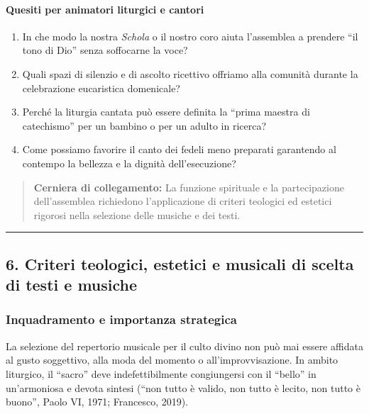\documentclass[12pt,a4paper]{article}
\begin{document}
	\paragraph{Quesiti per animatori liturgici e cantori}\label{quesiti-per-animatori-liturgici-e-cantori}
	
	\begin{enumerate}[label=\arabic*.,leftmargin=*]
		\item In che modo la nostra \emph{Schola} o il nostro coro aiuta l'assemblea a prendere ``il tono di Dio'' senza soffocarne la voce?
		\item Quali spazi di silenzio e di ascolto ricettivo offriamo alla comunità durante la celebrazione eucaristica domenicale?
		\item Perché la liturgia cantata può essere definita la ``prima maestra di catechismo'' per un bambino o per un adulto in ricerca?
		\item Come possiamo favorire il canto dei fedeli meno preparati garantendo al contempo la bellezza e la dignità dell'esecuzione?
	\end{enumerate}
	
	\begin{quote}
		\textbf{Cerniera di collegamento:} La funzione spirituale e la partecipazione dell'assemblea richiedono l'applicazione di criteri teologici ed estetici rigorosi nella selezione delle musiche e dei testi.
	\end{quote}
	
	\begin{center}\rule{0.5\linewidth}{0.5pt}\end{center}
	
	\subsection{6. Criteri teologici, estetici e musicali di scelta di testi e musiche}\label{criteri-teologici-estetici-e-musicali-di-scelta-di-testi-e-musiche}
	
	\subsubsection{Inquadramento e importanza strategica}\label{inquadramento-e-importanza-strategica-5}
	
	La selezione del repertorio musicale per il culto divino non può mai essere affidata al gusto soggettivo, alla moda del momento o all'improvvisazione. In ambito liturgico, il ``sacro'' deve indefettibilmente congiungersi con il ``bello'' in un'armoniosa e devota sintesi (``non tutto è valido, non tutto è lecito, non tutto è buono'', Paolo VI, 1971; Francesco, 2019).
	
\end{document}
